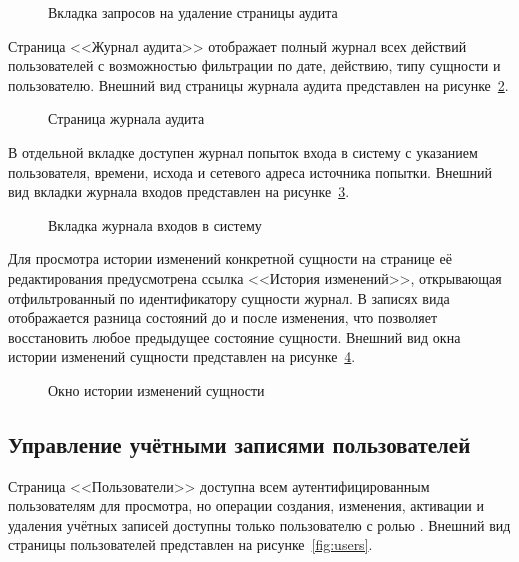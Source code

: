 \begin{figure}[htbp]
\centering
{}
\caption{Вкладка запросов на удаление страницы аудита}
\label{fig:pendingdeletions}
\end{figure}

Страница <<Журнал аудита>> отображает полный журнал всех действий пользователей с возможностью фильтрации по дате, действию, типу сущности и пользователю.
Внешний вид страницы журнала аудита представлен на рисунке~\ref{fig:auditlog}.

\begin{figure}[htbp]
\centering
{}
\caption{Страница журнала аудита}
\label{fig:auditlog}
\end{figure}

В отдельной вкладке доступен журнал попыток входа в систему с указанием пользователя, времени, исхода и сетевого адреса источника попытки.
Внешний вид вкладки журнала входов представлен на рисунке~\ref{fig:authlog}.

\begin{figure}[htbp]
\centering
{}
\caption{Вкладка журнала входов в систему}
\label{fig:authlog}
\end{figure}

Для просмотра истории изменений конкретной сущности на странице её редактирования предусмотрена ссылка <<История изменений>>, открывающая отфильтрованный по идентификатору сущности журнал.
В записях вида  отображается разница состояний до и после изменения, что позволяет восстановить любое предыдущее состояние сущности.
Внешний вид окна истории изменений сущности представлен на рисунке~\ref{fig:entityhistory}.

\begin{figure}[htbp]
\centering
{}
\caption{Окно истории изменений сущности}
\label{fig:entityhistory}
\end{figure}

\subsection{Управление учётными записями пользователей}

Страница <<Пользователи>> доступна всем аутентифицированным пользователям для просмотра, но операции создания, изменения, активации и удаления учётных записей доступны только пользователю с ролью .
Внешний вид страницы пользователей представлен на рисунке~\ref{fig:users}.

